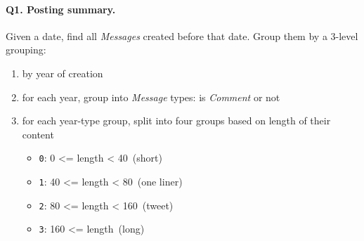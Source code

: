 \paragraph{\textbf{Q1}. Posting summary.}
Given a date, find all \emph{Messages} created before that date. Group
them by a 3-level grouping:
\begin{enumerate}
\def\labelenumi{\arabic{enumi}.}
\tightlist
\item
  by year of creation
\item
  for each year, group into \emph{Message} types: is \emph{Comment} or
  not
\item
  for each year-type group, split into four groups based on length of
  their content
  \begin{itemize}
  \tightlist
  \item
    \texttt{0}: 0 \textless{}= length \textless{} 40~(short)
  \item
    \texttt{1}: 40 \textless{}= length \textless{} 80~(one liner)
  \item
    \texttt{2}: 80 \textless{}= length \textless{} 160~(tweet)
  \item
    \texttt{3}: 160 \textless{}= length~(long)
  \end{itemize}
\end{enumerate}
